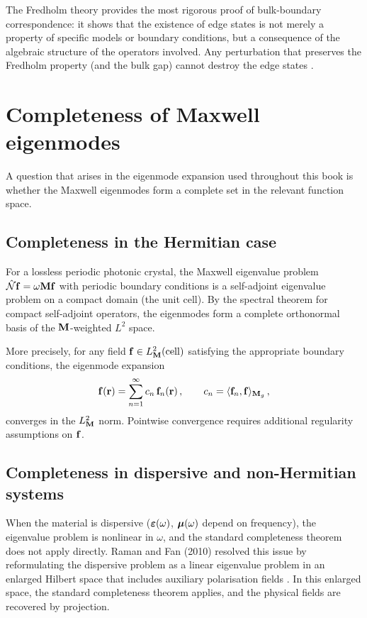 The Fredholm theory provides the most rigorous proof of
bulk-boundary correspondence: it shows that the existence of edge
states is not merely a property of specific models or boundary
conditions, but a consequence of the algebraic structure of the
operators involved.  Any perturbation that preserves the Fredholm
property (and the bulk gap) cannot destroy the edge states
\cite{nittis2020equivalence,ozawa2018topological}.

\section{Completeness of Maxwell eigenmodes}
\label{sec:appA-mode-completeness}

A question that arises in the eigenmode expansion used throughout
this book is whether the Maxwell eigenmodes form a complete set in
the relevant function space.

\subsection{Completeness in the Hermitian case}
\label{sec:appA-completeness-hermitian}

For a lossless periodic photonic crystal, the Maxwell eigenvalue
problem $\hat{\mathcal{N}}\mathbf{f}=\omega\mathbf{M}\mathbf{f}$ with periodic boundary
conditions is a self-adjoint eigenvalue problem on a compact domain
(the unit cell).  By the spectral theorem for compact self-adjoint
operators, the eigenmodes form a complete orthonormal basis of the
$\mathbf{M}$-weighted $L^2$ space.

More precisely, for any field
$\mathbf{f}\in L^2_{\mathbf{M}}(\mathrm{cell})$ satisfying the appropriate
boundary conditions, the eigenmode expansion
\begin{equation}\label{eq:appA-completeness-expansion}
  \mathbf{f}(\mathbf{r}) = \sum_{n=1}^\infty c_n\,\mathbf{f}_n(\mathbf{r})\,,
  \qquad c_n = \langle \mathbf{f}_n , \mathbf{f} \rangle_{\mathbf{M}_g}\,,
\end{equation}
converges in the $L^2_{\mathbf{M}}$ norm.  Pointwise convergence requires
additional regularity assumptions on $\mathbf{f}$.

\subsection{Completeness in dispersive and non-Hermitian systems}
\label{sec:appA-completeness-nh}

When the material is dispersive ($\boldsymbol{\varepsilon}(\omega)$, $\boldsymbol{\mu}(\omega)$
depend on frequency), the eigenvalue problem is nonlinear in
$\omega$, and the standard completeness theorem does not apply
directly.  Raman and Fan (2010) resolved this issue by
reformulating the dispersive problem as a linear eigenvalue problem
in an enlarged Hilbert space that includes auxiliary polarisation
fields \cite{raman2010photonic}.  In this enlarged space, the
standard completeness theorem applies, and the physical fields are
recovered by projection.

